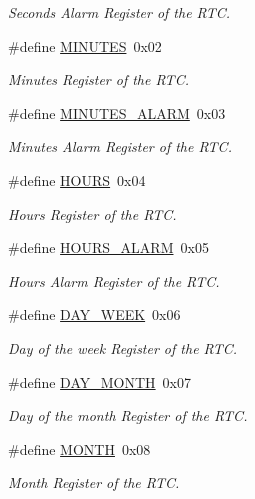 \begin{DoxyCompactItemize}
\begin{DoxyCompactList}\small\item\em Seconds Alarm Register of the R\+TC. \end{DoxyCompactList}\item 
\#define \hyperlink{group__rtc_ga84be9dcfa5a172ee83121620d15c8e29}{M\+I\+N\+U\+T\+ES}~0x02
\begin{DoxyCompactList}\small\item\em Minutes Register of the R\+TC. \end{DoxyCompactList}\item 
\#define \hyperlink{group__rtc_gadc030279159b8e16a47d21e393547689}{M\+I\+N\+U\+T\+E\+S\+\_\+\+A\+L\+A\+RM}~0x03
\begin{DoxyCompactList}\small\item\em Minutes Alarm Register of the R\+TC. \end{DoxyCompactList}\item 
\#define \hyperlink{group__rtc_ga212d0f839f6f7ca43ccde311f93d5892}{H\+O\+U\+RS}~0x04
\begin{DoxyCompactList}\small\item\em Hours Register of the R\+TC. \end{DoxyCompactList}\item 
\#define \hyperlink{group__rtc_gadc7e10d9ad06a95f30c5272967989e04}{H\+O\+U\+R\+S\+\_\+\+A\+L\+A\+RM}~0x05
\begin{DoxyCompactList}\small\item\em Hours Alarm Register of the R\+TC. \end{DoxyCompactList}\item 
\#define \hyperlink{group__rtc_gacd522b0e92d01c9bb65527206fc17508}{D\+A\+Y\+\_\+\+W\+E\+EK}~0x06
\begin{DoxyCompactList}\small\item\em Day of the week Register of the R\+TC. \end{DoxyCompactList}\item 
\#define \hyperlink{group__rtc_gaa652d6d52e8e86bfd3659f873c87a340}{D\+A\+Y\+\_\+\+M\+O\+N\+TH}~0x07
\begin{DoxyCompactList}\small\item\em Day of the month Register of the R\+TC. \end{DoxyCompactList}\item 
\#define \hyperlink{group__rtc_ga3729d06495d9713592f79f3122c9e677}{M\+O\+N\+TH}~0x08
\begin{DoxyCompactList}\small\item\em Month Register of the R\+TC. \end{DoxyCompactList}\item 

\end{DoxyCompactItemize}
